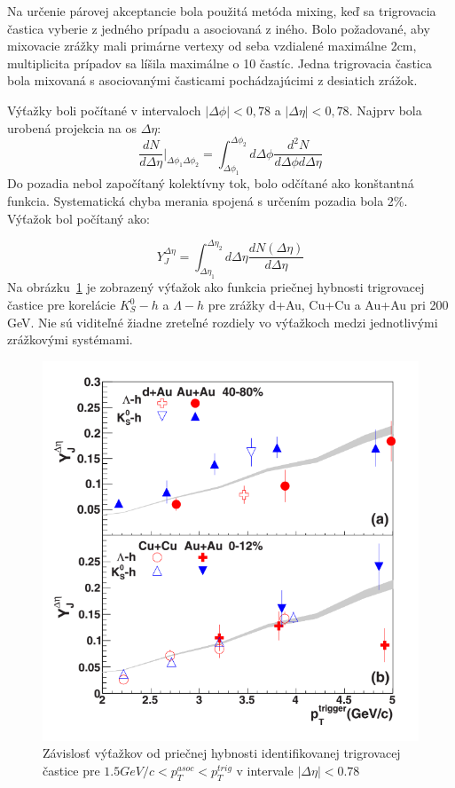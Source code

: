 \documentclass[thesismargins, thesislinespacing]{rnthesis}
\begin{document}
Na určenie párovej akceptancie bola použitá metóda mixing, keď sa trigrovacia častica vyberie z jedného prípadu a asociovaná z iného. Bolo požadované, aby mixovacie zrážky mali primárne vertexy od seba vzdialené maximálne 2cm, multiplicita prípadov sa líšila maximálne o 10 častíc. Jedna trigrovacia častica bola mixovaná s asociovanými časticami pochádzajúcimi z desiatich zrážok.

Výťažky boli počítané v intervaloch $|\Delta\phi|<0,78$ a $|\Delta\eta|<0,78$. Najprv bola urobená projekcia na os $\Delta\eta$:
\begin{equation}
\frac{dN}{d\Delta\eta}|_{\Delta\phi_1 \Delta\phi_2}= \int_{\Delta\phi_1}^{\Delta\phi_2}d\Delta\phi \frac{d^2N}{d\Delta \phi d\Delta \eta}
\end{equation}
Do pozadia nebol započítaný kolektívny tok, bolo odčítané ako konštantná funkcia. Systematická chyba merania spojená s určením pozadia bola 2\%. Výťažok bol počítaný ako:

\begin{equation}
Y^{\Delta\eta}_J=\int_{\Delta\eta_1}^{\Delta\eta_2}d\Delta\eta \frac{dN(\Delta\eta)}{d\Delta\eta}
\end{equation}
Na obrázku~\ref{clanokstar} je zobrazený výťažok ako funkcia priečnej hybnosti trigrovacej častice pre korelácie $K_S^0 - h$ a $\Lambda-h$ pre zrážky d+Au, Cu+Cu a Au+Au pri 200 GeV. Nie sú viditeľné žiadne zreteľné rozdiely vo výťažkoch medzi jednotlivými zrážkovými systémami. 

\begin{figure}[hbtp!]
	\centering
	\includegraphics[scale=0.5]{./Obrazky_praca/clanokstar.png}
	\caption{Závislosť výťažkov od priečnej hybnosti identifikovanej trigrovacej častice pre $1.5 GeV/c <p_T^{asoc}<p_T^{trig}$ v intervale $|\Delta\eta|<0.78$ ~\cite{clanokstar}}
	\label{clanokstar}
\end{figure}
\end{document}
